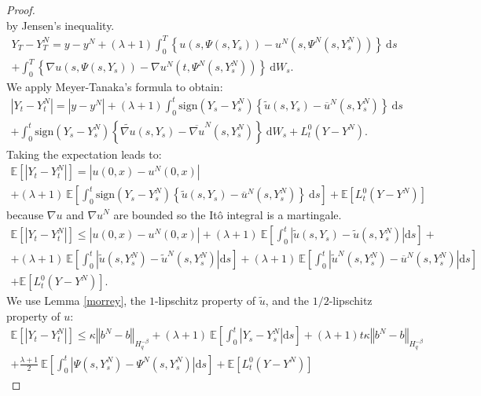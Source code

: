 \documentclass[11pt]{article}
\newcommand{\norme}[1]{\left\Vert #1\right\Vert}
\newcommand{\E}{\mathbb{E}}
\newcommand{\di}{\mathrm{d}}
\begin{document}
\begin{proof}
\begin{equation}
    \end{equation}    
    by Jensen's inequality. 
    \begin{multline*}
    Y_T-Y_T^N = y-y^N + (\lambda + 1 )\int_0^T\left\{u\left(s,\Psi\left(s,Y_s\right)\right)-u^N\left(s,\Psi^N\left(s,Y_s^N\right)\right)\right\}\ \di s\\ + \int_0^T\left\{\nabla u\left(s,\Psi\left(s,Y_s\right)\right)-\nabla u^N\left(t,\Psi^N\left(s,Y_s^N\right)\right)\right\}\ \di W_s.
    \end{multline*}
    We apply Meyer-Tanaka's formula to obtain:
    \begin{multline*}
    \left|Y_t-Y_t^N\right| = \left|y-y^N\right| + (\lambda + 1) \int_0^t\mathrm{sign}(Y_s-Y_s^N)\left\{\widetilde{u}\left(s,Y_s\right)-\overline{u}^N\left(s,Y_s^N\right)\right\}\ \di s\\ + \int_0^t\mathrm{sign}(Y_s-Y_s^N)\left\{\widetilde{\nabla u}\left(s,Y_s\right)-\overline{\nabla u}^N\left(s,Y_s^N\right)\right\}\ \di W_s + L_t^0(Y-Y^N).
     \end{multline*}    
    Taking the expectation leads to:
    \begin{multline*}
    \E\left[\left|Y_t-Y_t^N\right|\right] =  \left|u(0,x)-u^N(0,x)\right|\\ + (\lambda + 1)\ \E\left[\int_0^t\mathrm{sign}(Y_s-Y_s^N)\left\{\widetilde{u}\left(s,Y_s\right)-\overline{u}^N\left(s,Y_s^N\right)\right\}\ \di s\right] + \E \left[L_t^0(Y-Y^N)\right]
    \end{multline*}
    because ${\nabla u}$ and ${\nabla u}^N$ are bounded so the Itô integral is a martingale.    
    \begin{multline*}
    \E\left[\left|Y_t-Y_t^N\right|\right]\leq \left|u(0,x)-u^N(0,x)\right| + (\lambda + 1)\ \E\left[\int_0^t\left|\widetilde{u}\left(s,Y_s\right)-\widetilde{u}\left(s,Y_s^N\right)\right| \di s\right]+ \\ + (\lambda + 1)\ \E\left[\int_0^t\left|\widetilde{u}\left(s,Y_s^N\right)-\widetilde{u}^N\left(s,Y_s^N\right)\right| \di s\right] + (\lambda + 1)\ \E\left[\int_0^t\left|\widetilde{u}^N\left(s,Y_s^N\right)-\overline{u}^N\left(s,Y_s^N\right)\right| \di s\right]\\ + \E \left[L_t^0(Y-Y^N)\right].
    \end{multline*}
    We use Lemma \ref{morrey}, the $1$-lipschitz property of $\widetilde{u}$, and the $1/2$-lipschitz property of $u$:
    \begin{multline*}
    \E\left[\left|Y_t-Y_t^N\right|\right]\leq \kappa\norme{b^N-b}_{H^{-\beta}_{q}} + (\lambda + 1)\ \E\left[\int_0^t\left|Y_s-Y_s^N\right| \di s\right] + (\lambda + 1)t\kappa\norme{b^N-b}_{H^{-\beta}_{q}}\\+ \frac{\lambda + 1}{2}\ \E\left[\int_0^t\left|\Psi\left(s,Y_s^N\right)-\Psi^N\left(s,Y_s^N\right)\right| \di s\right]  + \E \left[L_t^0(Y-Y^N)\right]

\end{multline*}
\end{proof}
\end{document}

